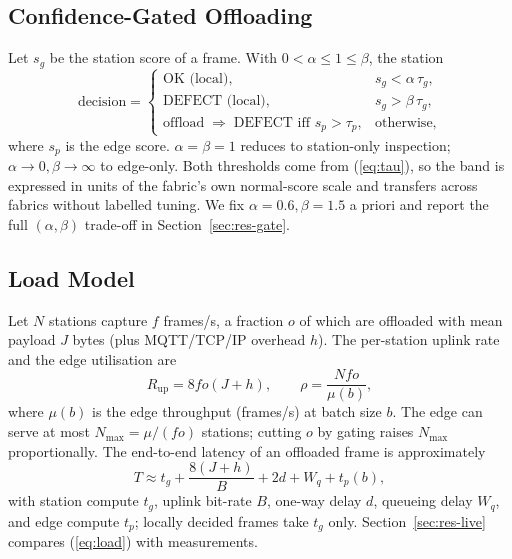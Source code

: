 \subsection{Confidence-Gated Offloading}\label{sec:gate}
Let $s_g$ be the station score of a frame. With $0<\alpha\le1\le\beta$, the station
\begin{equation}
\text{decision}=\begin{cases}
\text{OK (local)}, & s_g<\alpha\,\tau_g,\\
\text{DEFECT (local)}, & s_g>\beta\,\tau_g,\\
\text{offload}\;\Rightarrow\;\text{DEFECT iff } s_p>\tau_p, & \text{otherwise},
\end{cases}\label{eq:gate}
\end{equation}
where $s_p$ is the edge score. $\alpha=\beta=1$ reduces to station-only inspection; $\alpha\to0,\beta\to\infty$ to edge-only. Both thresholds come from (\ref{eq:tau}), so the band is expressed in units of the fabric's own normal-score scale and transfers across fabrics without labelled tuning. We fix $\alpha=0.6,\beta=1.5$ a priori and report the full $(\alpha,\beta)$ trade-off in Section~\ref{sec:res-gate}.

\subsection{Load Model}\label{sec:load}
Let $N$ stations capture $f$ frames/s, a fraction $o$ of which are offloaded with mean payload $J$ bytes (plus MQTT/TCP/IP overhead $h$). The per-station uplink rate and the edge utilisation are
\begin{equation}
R_{\mathrm{up}}=8fo(J+h),\qquad \rho=\frac{Nfo}{\mu(b)},\label{eq:load}
\end{equation}
where $\mu(b)$ is the edge throughput (frames/s) at batch size $b$. The edge can serve at most $N_{\max}=\mu/(fo)$ stations; cutting $o$ by gating raises $N_{\max}$ proportionally. The end-to-end latency of an offloaded frame is approximately
\begin{equation}
T\approx t_g+\frac{8(J+h)}{B}+2d+W_q+t_p(b),\label{eq:latency}
\end{equation}
with station compute $t_g$, uplink bit-rate $B$, one-way delay $d$, queueing delay $W_q$, and edge compute $t_p$; locally decided frames take $t_g$ only. Section~\ref{sec:res-live} compares (\ref{eq:load}) with measurements.
